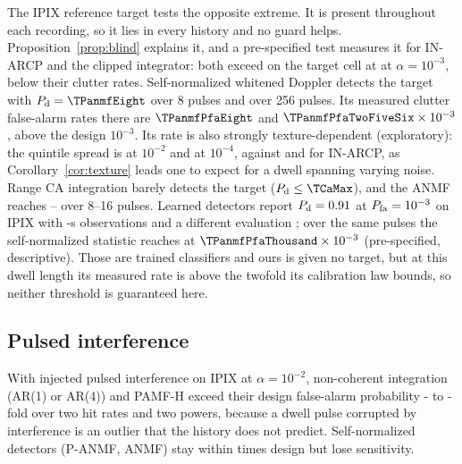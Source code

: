 \documentclass[journal]{IEEEtran}
\begin{document}
\label{sec:realtarget}The IPIX reference target tests the opposite extreme. It is present throughout each recording, so it lies in every history and no guard helps. Proposition~\ref{prop:blind} explains it, and a pre-specified test measures it for IN-ARCP and the clipped integrator: both exceed on the target cell at \TargetBlindRate{} at $\alpha=10^{-3}$, below their clutter rates. Self-normalized whitened Doppler detects the target with $P_{\rm d}=\TPanmfEight$ over 8 pulses and \TPanmfTwoFiveSix{} over 256 pulses. Its measured clutter false-alarm rates there are $\TPanmfPfaEight$ and $\TPanmfPfaTwoFiveSix\times10^{-3}$, above the design $10^{-3}$. Its rate is also strongly texture-dependent (exploratory): the quintile spread is \ConfSpreadPanmfTwo{} at $10^{-2}$ and \ConfSpreadPanmfFour{} at $10^{-4}$, against \ConfSpreadInTwo{} and \LInConfSpreadFour{} for IN-ARCP, as Corollary~\ref{cor:texture} leads one to expect for a dwell spanning varying noise. Range CA integration barely detects the target ($P_{\rm d}\le\TCaMax$), and the ANMF reaches \TFpEight--\TFpSixteen{} over 8--16 pulses. Learned detectors report $P_{\rm d}=0.91$ at $P_{\rm fa}=10^{-3}$ on IPIX with \TPanmfKiloSec-s observations and a different evaluation \cite{qu2023sensors}; over the same \TPanmfKiloPulses{} pulses the self-normalized statistic reaches \TPanmfThousand{} at $\TPanmfPfaThousand\times10^{-3}$ (pre-specified, descriptive). Those are trained classifiers and ours is given no target, but at this dwell length its measured rate is above the twofold its calibration law bounds, so neither threshold is guaranteed here.

\subsection{Pulsed interference}\label{sec:interf}
\begin{table}[!t]
\centering\footnotesize
\caption{Remedies for pulsed interference on IPIX ($\alpha=0.01$, \NUnitsConf{} units). Interference is injected 30~dB above the local power; each pulse is hit with probability $p_{\rm h}$, and bursts are eight pulses long at $p_{\rm h}=5\%$. Entries are the measured $P_{\rm fa}/\alpha$ and the $P_{\rm d}$ of a 10~dB persistent target. Trimmed: \TrimTwo{} ($2\%$) and \TrimFive{} ($5\%$) of eight terms discarded. Bold: $P_{\rm fa}/\alpha>1.2$.}
\label{tab:interf}
\setlength{\tabcolsep}{2.4pt}

\end{table}
With injected pulsed interference on IPIX at $\alpha=10^{-2}$, non-coherent integration (AR(1) or AR(4)) and PAMF-H exceed their design false-alarm probability \IPfaMinAll- to \IPfaMaxInt-fold over two hit rates and two powers, because a dwell pulse corrupted by interference is an outlier that the history does not predict. Self-normalized detectors (P-ANMF, ANMF) stay within \SelfNormIntMax{} times design but lose sensitivity.
\end{document}
